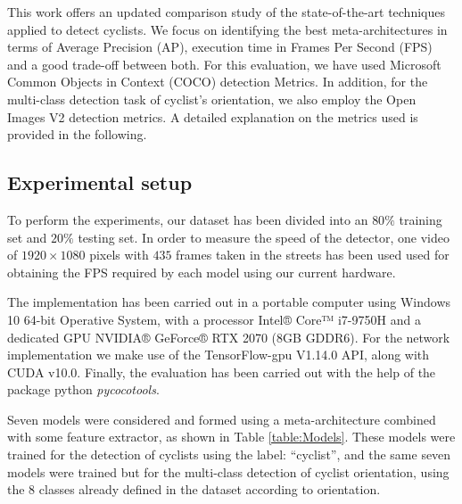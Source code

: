\documentclass[journal]{IEEEtran}
\begin{document}
This work offers an updated comparison study of the state-of-the-art techniques applied to detect cyclists. We focus on identifying the best meta-architectures in terms of Average Precision (AP), execution time in Frames Per Second (FPS) and a good trade-off between both. For this evaluation, we have used Microsoft Common Objects in Context (COCO) detection Metrics. In addition, for the multi-class detection task of cyclist's orientation, we also employ the Open Images V2 detection metrics. A detailed explanation on the metrics used is provided in the following.

\subsection{Experimental setup}
\label{sub:experimentalS}

To perform the experiments, our dataset has been divided into an $80\%$ training set and $20\%$ testing set. In order to measure the speed of the detector, one video of $1920\times1080$ pixels with $435$ frames taken in the streets has been used used for obtaining the FPS required by each model using our current hardware.

The implementation has been carried out in a portable computer using Windows 10 64-bit Operative System, with a processor Intel® Core™ i7-9750H and a dedicated GPU NVIDIA® GeForce® RTX 2070 (8GB GDDR6). For the network implementation we make use of the TensorFlow-gpu V1.14.0 API, along with CUDA v10.0. Finally, the evaluation has been carried out with the help of the package python \textit{pycocotools}.

Seven models were considered and formed using a meta-architecture combined with some feature extractor, as shown in Table \ref{table:Models}. These models were trained for the detection of cyclists using the label: ``cyclist'', and the same seven models were trained but for the multi-class detection of cyclist orientation, using the $8$ classes already defined in the dataset according to orientation. 
\end{document}

